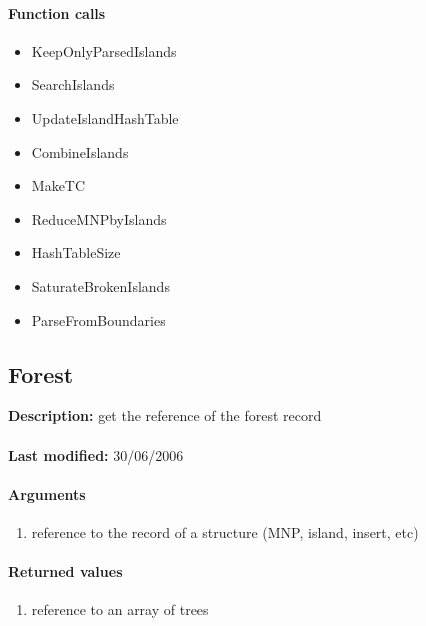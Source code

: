 \paragraph{Function calls}
\begin{itemize}
\item KeepOnlyParsedIslands
\item SearchIslands
\item UpdateIslandHashTable
\item CombineIslands
\item MakeTC
\item ReduceMNPbyIslands
\item HashTableSize
\item SaturateBrokenIslands
\item ParseFromBoundaries
\end{itemize}

\subsection{Forest}
\textbf{Description:} get the reference of the forest record\\
\\\textbf{Last modified:} 30/06/2006

\paragraph{Arguments}
\begin{enumerate}
\item reference to the record of a structure (MNP, island, insert, etc)
\end{enumerate}

\paragraph{Returned values}
\begin{enumerate}
\item reference to an array of trees
\end{enumerate}


